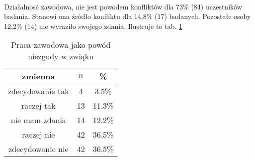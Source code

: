 
\

Działalnosć zawodowa, nie jest powodem konfliktów dla 73\% (84) uczestników badania. Stanowi ona źródło konfliktu dla 14,8\% (17) badanych. Pozostałe osoby 12,2\% (14) nie wyraziło swojego zdania. Ilustruje to tab. \ref{tab:Q28}


\begin{table}[H]
\caption{Praca zawodowa jako powód niezgody w zwiąku}
\centering
\begin{tabular}{ | c | c | c |}
\hline
zmienna & $n$ & \% \\
\hline
zdecydowanie tak  &  4  & 3.5\% \\
\hline
raczej tak  &  13  & 11.3\% \\
\hline
nie mam zdania  &  14  & 12.2\% \\
\hline
raczej nie  &  42  & 36.5\% \\
\hline
zdecydowanie nie  &  42  & 36.5\% \\
\hline
\end{tabular}
\label{tab:Q28}
\end{table}
